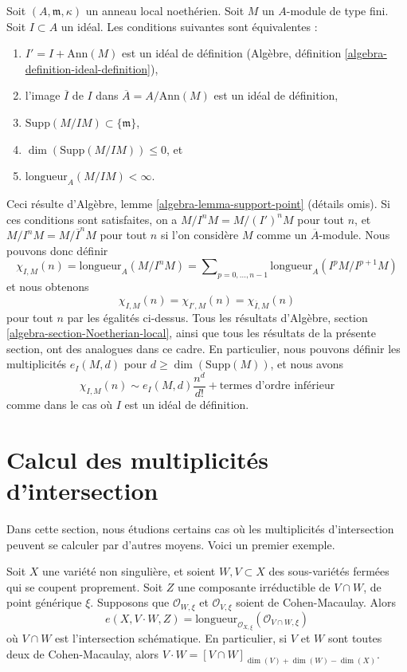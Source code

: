 \begin{remark}
\label{remark-trivial-generalization}
Soit $(A, \mathfrak m, \kappa)$ un anneau local noethérien.
Soit $M$ un $A$-module de type fini. Soit $I \subset A$ un idéal.
Les conditions suivantes sont équivalentes :
\begin{enumerate}
\item $I' = I + \text{Ann}(M)$ est un idéal de définition
(Algèbre, définition \ref{algebra-definition-ideal-definition}),
\item l'image $\overline{I}$ de $I$ dans $\overline{A} = A/\text{Ann}(M)$
est un idéal de définition,
\item $\text{Supp}(M/IM) \subset \{\mathfrak m\}$,
\item $\dim(\text{Supp}(M/IM)) \leq 0$, et
\item $\text{longueur}_A(M/IM) < \infty$.
\end{enumerate}
Ceci résulte d'Algèbre, lemme \ref{algebra-lemma-support-point}
(détails omis). Si ces conditions sont satisfaites, on a $M/I^nM = M/(I')^nM$
pour tout $n$, et $M/I^nM = M/\overline{I}^nM$ pour tout $n$
si l'on considère $M$ comme un $\overline{A}$-module.
Nous pouvons donc définir
$$
\chi_{I, M}(n) = \text{longueur}_A(M/I^nM) =
\sum\nolimits_{p = 0, \ldots, n - 1} \text{longueur}_A(I^pM/I^{p + 1}M)
$$
et nous obtenons
$$
\chi_{I, M}(n) = \chi_{I', M}(n) = \chi_{\overline{I}, M}(n)
$$
pour tout $n$ par les égalités ci-dessus.
Tous les résultats d'Algèbre, section \ref{algebra-section-Noetherian-local},
ainsi que tous les résultats de la présente section, ont des analogues dans ce cadre.
En particulier, nous pouvons définir les multiplicités $e_I(M, d)$ pour
$d \geq \dim(\text{Supp}(M))$, et nous avons
$$
\chi_{I, M}(n) \sim e_I(M, d) \frac{n^d}{d!} + \text{termes d'ordre inférieur}
$$
comme dans le cas où $I$ est un idéal de définition.
\end{remark}



\section{Calcul des multiplicités d'intersection}
\label{section-computing-intersection-multiplicities}

\noindent
Dans cette section, nous étudions certains cas où les multiplicités d'intersection
peuvent se calculer par d'autres moyens. Voici un premier exemple.

\begin{lemma}
\label{lemma-intersection-multiplicity-CM}
Soit $X$ une variété non singulière, et soient $W, V \subset X$ des
sous-variétés fermées qui se coupent proprement. Soit $Z$ une composante irréductible
de $V \cap W$, de point générique $\xi$. Supposons que $\mathcal{O}_{W, \xi}$
et $\mathcal{O}_{V, \xi}$ soient de Cohen-Macaulay. Alors
$$
e(X, V \cdot W, Z) =
\text{longueur}_{\mathcal{O}_{X, \xi}}(\mathcal{O}_{V \cap W, \xi})
$$
où $V \cap W$ est l'intersection schématique.
En particulier, si $V$ et $W$ sont toutes deux de Cohen-Macaulay, alors
$V \cdot W = [V \cap W]_{\dim(V) + \dim(W) - \dim(X)}$.
\end{lemma}

